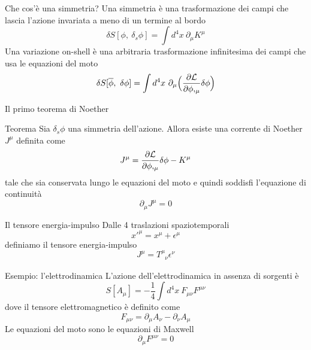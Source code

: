 \begin{frame}{Che cos'è una simmetria?}
    Una simmetria è una trasformazione dei campi che lascia l'azione invariata a meno di un termine al bordo
    \begin{equation*}
        \delta S[\phi, ~\delta_s \phi] = \int d^4 x ~ \partial_\mu K^\mu
    \end{equation*}
      Una variazione on-shell è una arbitraria trasformazione infinitesima dei campi che usa le equazioni del moto
    \begin{equation*}
        \delta S[\overline \phi, ~\delta \phi] = \int d^4 x ~ \partial_\mu \Big ( \frac{\partial\mathcal L}{\partial\phi,_\mu}  \delta \phi \Big) 
    \end{equation*} 
\end{frame}

\begin{frame}{Il primo teorema di Noether}
    \begin{block}{Teorema}
        Sia $\delta_s \phi$ una simmetria dell'azione. Allora esiste una corrente di Noether $J^\mu$ definita come
        \begin{equation*}
            J^\mu = \frac{\partial\mathcal L}{\partial\phi,_\mu} \delta \phi - K^\mu
        \end{equation*}
            tale che sia conservata lungo le equazioni del moto e quindi soddisfi l'equazione di continuità
        \begin{equation*} 
            \partial_\mu J^\mu = 0
        \end{equation*}
    \end{block}
\end{frame}

\begin{frame}{Il tensore energia-impulso}
    Dalle 4 traslazioni spaziotemporali
    \begin{equation*}
        x'^\mu = x^\mu + \epsilon^\mu
    \end{equation*}
    definiamo il tensore energia-impulso
    \begin{equation*} 
        J^\mu = T^\mu_{\phantom \mu \nu} \epsilon^\nu
    \end{equation*}
\end{frame}

\begin{frame}{Esempio: l'elettrodinamica}
    L'azione dell'elettrodinamica in assenza di sorgenti è
    \begin{equation*}
        S[A_\mu] = - \frac{1}{4} \int d^4 x ~ F_{\mu\nu} F^{\mu\nu}
    \end{equation*}
    dove il tensore elettromagnetico è definito come 
    \begin{equation*}
        F_{\mu\nu} = \partial_\mu A_\nu - \partial_\nu A_\mu
    \end{equation*}
      Le equazioni del moto sono le equazioni di Maxwell
    \begin{equation*}
        \partial_\mu F^{\mu\nu} = 0
    \end{equation*}

\end{frame}

